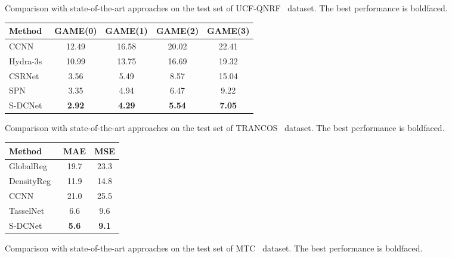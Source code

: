 \documentclass[10pt,twocolumn,letterpaper]{article}
\begin{document}
\begin{figure*}
\begin{minipage}{\textwidth}
\begin{minipage}{.30\textwidth}
\begin{tabular}{|l|c|c|}
					\hline
				\end{tabular}
				\vspace{5pt}
				\caption{Comparison with state-of-the-art approaches on the test set of UCF-QNRF~\cite{Compose_Loss_2018_ECCV} dataset. The best performance is boldfaced.\newline}
				\label{tab:compare_UCF-QNRF}    
			\end{minipage}
			\vfill
			\vspace{5pt}
\makeatletter{}\makeatother
			\begin{minipage}{.5\textwidth}
				\centering
				\footnotesize
				\addtolength{\tabcolsep}{2pt}
				\begin{tabular}{|l|c|c|c|c|}
					\hline
					Method &GAME(0) &GAME(1)&GAME(2)&GAME(3)\\
					\hline
CCNN~\cite{O2016Towards_CCNN}&12.49 &16.58 &20.02 &22.41\\
					Hydra-3s~\cite{O2016Towards_CCNN}&10.99 &13.75 &16.69 &19.32\\
					CSRNet~\cite{CSRNet_2018_CVPR}&3.56 &5.49 &8.57 &15.04\\
					SPN~\cite{SPN_2019_WACV}&3.35 &4.94 &6.47 &9.22\\
					\hline
					S-DCNet & \textbf{2.92} &\textbf{4.29} &\textbf{5.54} &\textbf{7.05}\\
					\hline
				\end{tabular}
				\vspace{0pt}
				\caption{Comparison with state-of-the-art approaches on the test set of TRANCOS~\cite{TRANCOSdataset_IbPRIA2015} dataset. The best performance is boldfaced.}
				\label{tab:compare_Trancos}    
			\end{minipage}
			\hfill
\makeatletter{}\makeatother
			\begin{minipage}{.46\textwidth}
				\centering
				\footnotesize
				\addtolength{\tabcolsep}{2pt}
				\begin{tabular}{|l|c|c|}
					\hline
					Method & MAE &MSE\\
					\hline
					
GlobalReg~\cite{tota2015counting}             & 19.7 & 23.3\\
					DensityReg~\cite{vlaz2010denlearn}             & 11.9 & 14.8\\
					CCNN~\cite{O2016Towards_CCNN}                  & 21.0 & 25.5\\
					TasselNet~\cite{Lu2017TasselNet}		       & 6.6 & 9.6\\
					\hline
					S-DCNet & \textbf{5.6} &\textbf{9.1}\\
					\hline
				\end{tabular}
				\vspace{5pt}
				\caption{Comparison with state-of-the-art approaches on the test set of MTC~\cite{Lu2017TasselNet} dataset. The best performance is boldfaced.}
				\label{tab:compare_MTC}    
			\end{minipage}
			\hfill
			

\end{minipage}
\end{figure*}
\end{document}
